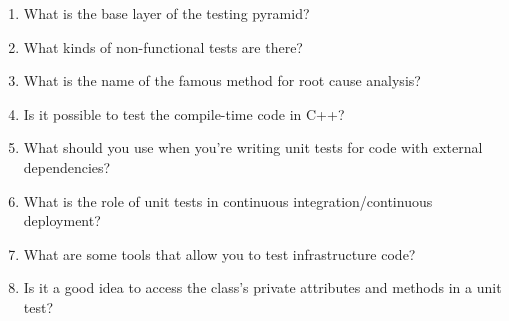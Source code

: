 \begin{enumerate}
\item
What is the base layer of the testing pyramid?

\item
What kinds of non-functional tests are there?

\item
What is the name of the famous method for root cause analysis?

\item
Is it possible to test the compile-time code in C++?

\item
What should you use when you're writing unit tests for code with external dependencies?

\item
What is the role of unit tests in continuous integration/continuous deployment?

\item
What are some tools that allow you to test infrastructure code?

\item
Is it a good idea to access the class's private attributes and methods in a unit test?
\end{enumerate}